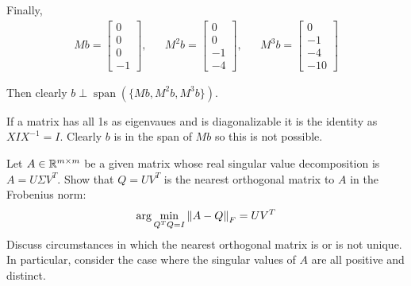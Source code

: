 \documentclass[10pt]{article}
\begin{document}
\begin{solution}[Solution]
\begin{enumerate}[label=(\alph*)]
        Finally,
        \begin{align*}
            Mb = \left[\begin{array}{r}0\\0\\0\\-1\end{array}\right]
            ,&&
            M^2b = \left[\begin{array}{r}0\\0\\-1\\-4\end{array}\right]
            ,&&
            M^3b = \left[\begin{array}{r}0\\-1\\-4\\-10\end{array}\right]
        \end{align*}
        
        Then clearly \( b\perp\operatorname{span}(\{Mb,M^2b,M^3b\}) \).

        If a matrix has all 1s as eigenvaues and is diagonalizable it is the identity as \( X I X^{-1} = I \). Clearly \( b \) is in the span of \( Mb \) so this is not possible.


\end{enumerate}
\end{solution}


\begin{problem}
    Let \( A\in\mathbb{R}^{m\times m} \) be a given matrix whose real singular value decomposition is \( A= U\Sigma V^T \). Show that \( Q = UV^T \) is the nearest orthogonal matrix to \( A \) in the Frobenius norm:
    \begin{align*}
        \arg\min_{Q^TQ=I}\left\lVert A-Q\right\rVert_F=UV^T
    \end{align*}
    Discuss circumstances in which the nearest orthogonal matrix is or is not unique. In particular, consider the case where the singular values of \( A \) are all positive and distinct.
\end{problem}
\end{document}
